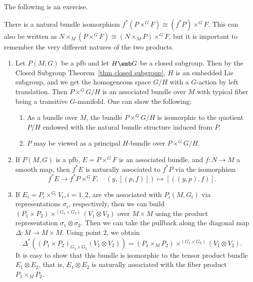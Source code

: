 The following is an exercise.
\begin{prop}\label{prop 1.2.8 RS2}
    There is a natural bundle isomorphism $f^\ast (P\times^G F)\cong (f^\ast P)\times^G F$. This can also be written as $N\times_M (P\times^G F)\cong (N\times_M P)\times^G F$, but it is important to remember the very different natures of the two products.
\end{prop}



\begin{example}\label{ex 1.2.4 RS2}
    \begin{enumerate}
        \item Let $P(M,G)$ be a \gls{pfb} and let $H\emb G$ be a closed subgroup. Then by the Closed Subgroup Theorem~\ref{thm closed subgroup}, $H$ is an embedded Lie subgroup, and we get the homogeneous space $G\slash H$ with a $G$-action by left translation. Then $P\times^G G\slash H$ is an associated bundle over $M$ with typical fiber being a transitive $G$-manifold. One can show the following:
        \begin{enumerate}
            \item As a bundle over $M$, the bundle $P\times^G G\slash H$ is isomorphic to the quotient $P\slash H$ endowed with the natural bundle structure induced from $P$.
            \item $P$ may be viewed as a principal $H$-bundle over $P\times^G G\slash H$.
        \end{enumerate}
        \item If $P(M,G)$ is a \gls{pfb}, $E=P\times^G F$ is an associated bundle, and $f:N\to M$ a smooth map, then $f^\ast E$ is naturally associated to $f^\ast P$ via the isomorphism
        \[f^\ast E\to f^\ast P\times^G F,\quad (y,[(p,f)])\mapsto [((y,p),f)].\label{eq 1.2.6 RS2}\]
        \item If $E_i=P_i\times^{G_i}V_i,i=1,2$, are \glspl{vb} associated with $P_i(M,G_i)$ via representations $\sigma_i$, respectively, then we can build $(P_1\times P_2)\times^{(G_1\times G_2)}(V_1\otimes V_2)$ over $M\times M$ using the product representation $\sigma_1\otimes \sigma_2$. Then we can take the pullback along the diagonal map $\Delta:M\to M\times M$. Using point 2, we obtain
        \[\Delta^\ast((P_1\times P_2)_{G_1\times G_2}(V_1\otimes V_2))=(P_1\times_M P_2)\times^{(G_1\times G_2)}(V_1\otimes V_2).\]
        It is easy to show that this bundle is isomorphic to the tensor product bundle $E_1\otimes E_2$, that is, $E_1\otimes E_2$ is naturally associated with the fiber product $P_1\times_M P_2$.
    \end{enumerate}
\end{example}


